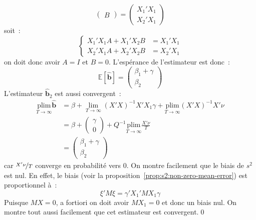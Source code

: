 \documentclass[10pt,a4paper]{article}
\theoremstyle{definition}
\begin{document}
\begin{notes}
\[\begin{pmatrix}
      B
    \end{pmatrix} =
    \begin{pmatrix}
      X_1'X_1\\
      X_2'X_1
    \end{pmatrix}
  \]
  soit~:
  \[
    \begin{cases}
      X_1'X_1 A +X_1'X_2 B &= X_1'X_1\\
      X_2'X_1 A +X_2'X_2 B &= X_2'X_1
    \end{cases}
  \]
  on doit donc avoir $A=I$ et $B=0$. L'espérance de l'estimateur est donc~:
  \[
    \mathbb E\left[ \hat{\mathbf b} \right] =
    \begin{pmatrix}
      \beta_1 + \gamma\\ \beta_2
    \end{pmatrix}
  \]
  L'estimateur $\hat{\mathbf b}_2$ est aussi convergent~:
  \[
    \begin{split}
      \underset{T\rightarrow\infty}{\text{plim}} \hat{\mathbf b} &= \beta
    +
    \underset{T\rightarrow\infty}{\lim} (X'X)^{-1}X'X_1\gamma
                                                                   + \underset{T\rightarrow\infty}{\text{plim}} (X'X)^{-1}X'\nu\\
                                                                 &= \beta
                                                                   +
                                                                   \begin{pmatrix}
                                                                     \gamma\\
                                                                     0
                                                                   \end{pmatrix}
                                                                   + Q^{-1}\underset{T\rightarrow\infty}{\text{plim}} \frac{X'\nu}{T}\\
                                                                 &=
                                                                   \begin{pmatrix}
                                                                     \beta_1+\gamma\\
                                                                     \beta_2
                                                                   \end{pmatrix}
    \end{split}
  \]
  car $\nicefrac{X'\nu}{T}$ converge en probabilité vers 0. On montre facilement que le biais de $s^2$ est nul. En effet, le biais (voir la proposition~\ref{prop:s2:non-zero-mean-error}) est proportionnel à~:
  \[
    \xi'M\xi = \gamma'X_1'M X_1\gamma
  \]
Puisque $MX=0$, a fortiori on doit avoir $MX_1=0$ et donc un biais nul. On montre tout aussi facilement que cet estimateur est convergent.\qed
\end{notes}
\end{document}
